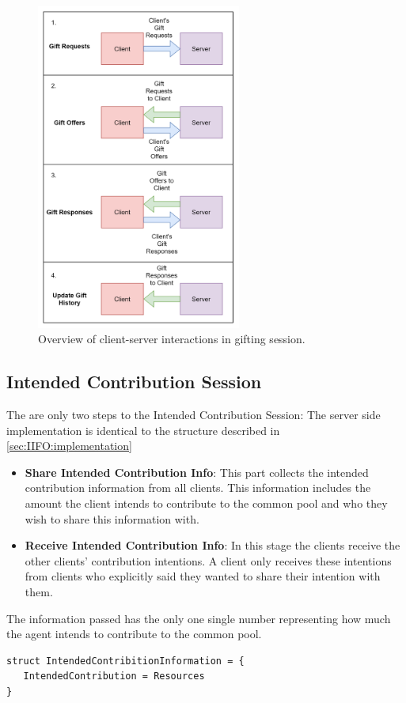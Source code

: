\begin{figure}[!htb]
    \centering
    \includegraphics[width=0.6\textwidth]{06_iito/images/gifting_diagram.png}
    \caption{Overview of client-server interactions in gifting session.}
    \label{fig:IITO:gifting_session_diagram}
\end{figure}

\subsection{Intended Contribution Session}
\label{subsec:IITO:intended_contribution_session}
The are only two steps to the Intended Contribution Session: The server side implementation is identical to the structure described in \ref{sec:IIFO:implementation}
\begin{itemize}
    \item \textbf{Share Intended Contribution Info}: This part collects the intended contribution information from all clients. This information includes the amount the client intends to contribute to the common pool and who they wish to share this information with.
    \item \textbf{Receive Intended Contribution Info}: In this stage the clients receive the other clients' contribution intentions. A client only receives these intentions from clients who explicitly said they wanted to share their intention with them.
\end{itemize}
The information passed has the only one single number representing how much the agent intends to contribute to the common pool. 
\begin{verbatim}
struct IntendedContribitionInformation = {
   IntendedContribution = Resources
}
\end{verbatim}
